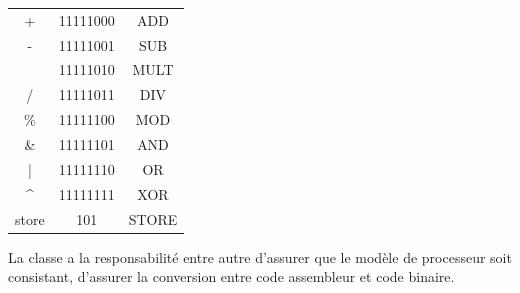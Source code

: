 \begin{minipage}[t]{0.48\textwidth}
\begin{minipage}[t]{0.5\textwidth}
\begin{tabular}{>{\ttfamily\footnotesize}c|>{\ttfamily\footnotesize}c|>{\ttfamily\footnotesize}c}
			+                  & 11111000 & ADD   \\
			-                  & 11111001 & SUB   \\
			*                  & 11111010 & MULT  \\
			/                  & 11111011 & DIV   \\
			\%                 & 11111100 & MOD   \\
			\&                 & 11111101 & AND   \\
			|                  & 11111110 & OR    \\
			\textasciicircum{} & 11111111 & XOR   \\
			store              & 101      & STORE
		\end{tabular}
	\end{minipage}
\end{minipage}

La classe  a la responsabilité entre autre d'assurer que le modèle de processeur soit consistant, d'assurer la conversion entre code assembleur et code binaire.
%		
%
%	

\clearpage

